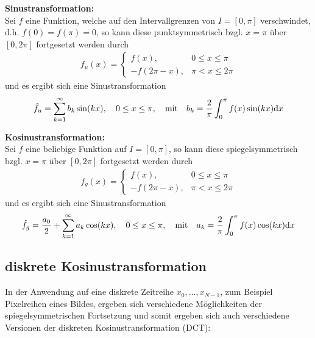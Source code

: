 \textbf{Sinustransformation:} \\
Sei $f$ eine Funktion, welche auf den Intervallgrenzen von $I=[0,\pi]$ verschwindet, d.h. $f(0)=f(\pi)=0$, so kann 
diese punktsymmetrisch bzgl. $x=\pi$ über $[0,2\pi]$ fortgesetzt werden durch 
%
\begin{align*}
  f_u(x) = \begin{cases}
    f(x), & 0\leq x \leq \pi \\
    -f(2\pi-x), &\pi < x \leq 2\pi
  \end{cases}
\end{align*}
%
und es ergibt sich eine Sinustransformation 
%
\begin{align*}
  \hat{f}_u = \sum_{k=1}^{\infty} b_k\sin(kx), 
  \quad 0\leq x\leq \pi, 
  \quad\text{mit}\quad b_k = \dfrac{2}{\pi}\int_{0}^{\pi} f(x) \sin(kx) \text{d} x
\end{align*}
%

\textbf{Kosinustransformation:} \\
Sei $f$ eine beliebige Funktion auf $I=[0,\pi]$, so kann 
diese spiegelsymmetrisch bzgl. $x=\pi$ über $[0,2\pi]$ fortgesetzt werden durch 
%
\begin{align*}
  f_g(x) = \begin{cases}
    f(x), & 0\leq x \leq \pi \\
    -f(2\pi-x), &\pi < x \leq 2\pi
  \end{cases}
\end{align*}
%
und es ergibt sich eine Sinustransformation 
%
\begin{align*}
  \hat{f}_g = \dfrac{a_0}{2} + \sum_{k=1}^{\infty} a_k\cos(kx), 
  \quad 0\leq x\leq \pi, 
  \quad\text{mit}\quad a_k = \dfrac{2}{\pi}\int_{0}^{\pi} f(x) \cos(kx) \text{d} x
\end{align*}
%

\subsection{diskrete Kosinustransformation}

In der Anwendung auf eine diskrete Zeitreihe $x_0,\dots,x_{N-1}$, zum Beispiel Pixelreihen eines Bildes, ergeben 
sich verschiedene Möglichkeiten der spiegelsymmetrischen Fortsetzung und somit ergeben sich auch verschiedene 
Versionen der diskreten Kosinustransformation (DCT):

